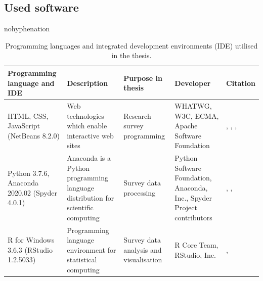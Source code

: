 \subsection{Used software}
\justify

\begin{hyphenrules}{nohyphenation}
    \begin{table}[H]
        \centering
        \caption{Programming languages and integrated development environments (IDE) utilised in the thesis.} 
        \label{tab:usedlangs}
        \def\arraystretch{1.3}
        \setlength\tabcolsep{1.2ex}
        \begin{tabular}{ @{} >{\raggedright\arraybackslash}p{3cm} >{\raggedright\arraybackslash}p{3.5cm} >{\raggedright\arraybackslash}p{2.5cm} >{\raggedright\arraybackslash}p{3cm} >{\raggedleft\arraybackslash}p{3cm} @{} }
            \toprule
            Programming language and IDE & Description & Purpose in thesis & Developer & Citation \\
            \midrule
            HTML, CSS, JavaScript (NetBeans 8.2.0) & Web technologies which enable interactive web sites & Research survey programming & WHATWG, W3C, ECMA\footnotemark, Apache Software Foundation & \cite{WHATWG2020}, \cite{W3C2020}, \cite{ECMA2019}, \cite{ApacheSoftwareFoundation2016} \\
            Python 3.7.6, Anaconda 2020.02 (Spyder 4.0.1) & Anaconda is a Python programming language distribution for scientific computing & Survey data processing & Python Software Foundation, Anaconda, Inc., Spyder Project contributors & \cite{Python3Reference}, \cite{AnacondaInc.2020}, \cite{SpyderProjectContributors2020} \\
            R for Windows 3.6.3 (RStudio 1.2.5033) & Programming language environment for statistical computing & Survey data analysis and visualisation & R Core Team, RStudio, Inc. & \cite{RCoreTeam2020}, \cite{RStudioTeam2015} \\
            \bottomrule
        \end{tabular}
    \end{table} 
\end{hyphenrules}


